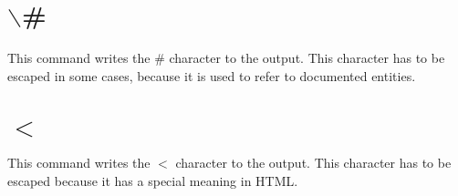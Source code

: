  \hypertarget{commands_cmdhash}{}\section{$\backslash$\#}\label{commands_cmdhash}
 This command writes the \# character to the output. This character has to be escaped in some cases, because it is used to refer to documented entities.



 \hypertarget{commands_cmdlt}{}\section{$<$}\label{commands_cmdlt}
 This command writes the $<$ character to the output. This character has to be escaped because it has a special meaning in HTML.



